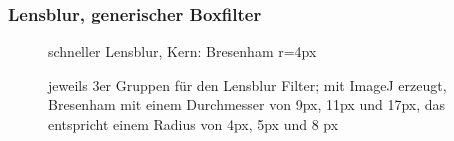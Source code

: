 \documentclass[a4paper,12pt]{article}
\begin{document}
\begin{verbatim}
\end{verbatim}


\subsubsection{Lensblur, generischer Boxfilter}

\begin{figure}[htbp]
\caption{schneller Lensblur, Kern: Bresenham r=4px}
\label{figure_lensblur_box}
\end{figure}

\begin{figure}[htbp]
\caption{jeweils 3er Gruppen für den Lensblur Filter;
 mit ImageJ erzeugt, Bresenham mit einem Durchmesser von 9px, 11px und 17px,
 das entspricht einem Radius von 4px, 5px und 8 px}
\label{figure_bresenham}
\end{figure}
\end{document}
